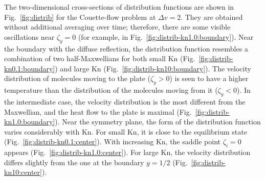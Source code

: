 \documentclass[review]{elsarticle}
\newcommand{\Kn}{\mathrm{Kn}}
\begin{document}
The two-dimensional cross-sections of distribution functions are shown
in Fig.~\ref{fig:distrib} for the Couette-flow problem at \(\Delta{v}=2\).
They are obtained without additional averaging over time;
therefore, there are some visible oscillations near \(\zeta_y=0\)
(for example, in Fig.~\ref{fig:distrib-kn1.0:boundary}).
Near the boundary with the diffuse reflection, the distribution function resembles
a combination of two half-Maxwellians for both small \(\Kn\) (Fig.~\ref{fig:distrib-kn0.1:boundary})
and large \(\Kn\) (Fig.~\ref{fig:distrib-kn10:boundary}).
The velocity distribution of molecules moving to the plate (\(\zeta_y>0\)) is seen to
have a higher temperature than the distribution of the molecules moving from it (\(\zeta_y<0\)).
In the intermediate case, the velocity distribution is the most different from the Maxwellian,
and the heat flow to the plate is maximal (Fig.~\ref{fig:distrib-kn1.0:boundary}).
Near the symmetry plane, the form of the distribution function
varies considerably with \(\Kn\).
For small \(\Kn\), it is close to the equilibrium state (Fig.~\ref{fig:distrib-kn0.1:center}).
With increasing \(\Kn\), the saddle point \(\zeta_i=0\) appears (Fig.~\ref{fig:distrib-kn1.0:center}).
For large \(\Kn\), the velocity distribution differs slightly from the one
at the boundary \(y=1/2\) (Fig.~\ref{fig:distrib-kn10:center}).
\end{document}
